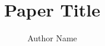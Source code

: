 \title{Paper Title}

\author{Author Name}

\maketitle

\begin{abstract}
\end{abstract}

\begin{IEEEkeywords}
\end{IEEEkeywords}